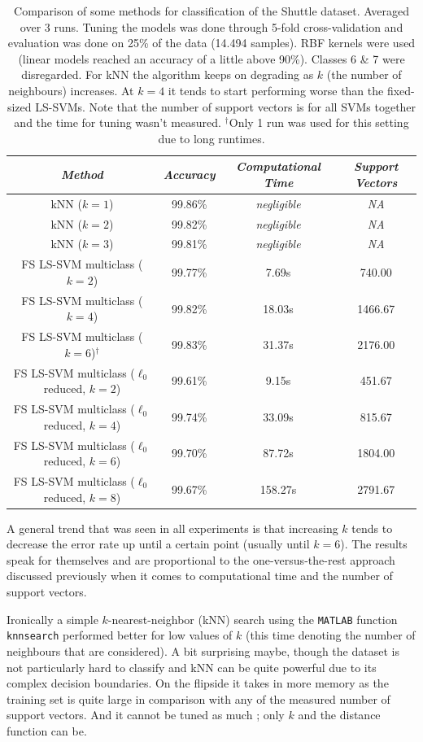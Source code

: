 \begin{table}[htb]
\centering
\begin{tabular}{c|ccc}
\textit{Method} & \textit{Accuracy} & \textit{Computational Time} & \textit{Support Vectors} \\\hline
kNN ($k=1$) & 99.86\% & \textit{negligible} & \textit{NA} \\
kNN ($k=2$) & 99.82\% & \textit{negligible} & \textit{NA} \\
kNN ($k=3$) & 99.81\% & \textit{negligible} & \textit{NA} \\
FS LS-SVM multiclass ($k=2$) & 99.77\% & 7.69s & 740.00 \\
FS LS-SVM multiclass ($k=4$) & 99.82\% & 18.03s & 1466.67 \\
FS LS-SVM multiclass ($k=6$)$^{\dagger}$ & 99.83\% & 31.37s & 2176.00 \\
FS LS-SVM multiclass ($\ell_0$ reduced, $k=2$) & 99.61\% & 9.15s & 451.67 \\
FS LS-SVM multiclass ($\ell_0$ reduced, $k=4$) & 99.74\% & 33.09s & 815.67 \\
FS LS-SVM multiclass ($\ell_0$ reduced, $k=6$) & 99.70\% & 87.72s & 1804.00 \\
FS LS-SVM multiclass ($\ell_0$ reduced, $k=8$) & 99.67\% & 158.27s & 2791.67 \\
\end{tabular}
\caption{Comparison of some methods for classification of the Shuttle dataset. Averaged over 3 runs. Tuning the models was done through 5-fold cross-validation and evaluation was done on 25\% of the data (14.494 samples). RBF kernels were used (linear models reached an accuracy of a little above 90\%). Classes 6 \& 7 were disregarded. For kNN the algorithm keeps on degrading as $k$ (the number of neighbours) increases. At $k=4$ it tends to start performing worse than the fixed-sized LS-SVMs. Note that the number of support vectors is for all SVMs together and the time for tuning wasn't measured. $^{\dagger}$Only 1 run was used for this setting due to long runtimes.}
\label{shuttlemulticomparison}
\end{table}

A general trend that was seen in all experiments is that increasing $k$ tends to decrease the error rate up until a certain point (usually until $k=6$). The results speak for themselves and are proportional to the one-versus-the-rest approach discussed previously when it comes to computational time and the number of support vectors.

\par Ironically a simple $k$-nearest-neighbor (kNN) search using the \texttt{MATLAB} function \texttt{knnsearch} performed better for low values of $k$ (this time denoting the number of neighbours that are considered). A bit surprising maybe, though the dataset is not particularly hard to classify and kNN can be quite powerful due to its complex decision boundaries. On the flipside it takes in more memory as the training set is quite large in comparison with any of the measured number of support vectors. And it cannot be tuned as much ; only $k$ and the distance function can be.

